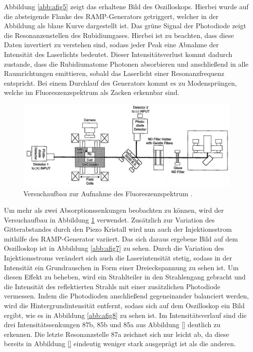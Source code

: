 Abbildung \ref{abb:afig5} zeigt das erhaltene Bild des Oszilloskops.
Hierbei wurde auf die absteigende Flanke des RAMP-Generators getriggert, welcher in der Abbildung als blaue Kurve dargestellt ist.
Das grüne Signal der Photodiode zeigt die Resonanzenstellen des Rubidiumgases.
Hierbei ist zu beachten, dass diese Daten invertiert zu verstehen sind, sodass jeder Peak eine Abnahme der Intensität des Laserlichts bedeutet.
Dieser Intensitätsverlust kommt dadurch zustande, dass die Rubidiumatome Photonen absorbieren und anschließend in alle Raumrichtungen emittieren, sobald das Laserlicht einer Resonanzfrequenz entspricht.
Bei einem Durchlauf des Generators kommt es zu Modensprüngen, welche im Fluoreszenzspektrum als Zacken erkennbar sind.

\begin{figure}
    \centering
    \includegraphics[width=\textwidth]{pics/aufbau3}
    \caption{Versuchaufbau zur Aufnahme des Fluoreszenzspektrum \cite{anleitung}.}
    \label{abb:afig6}
\end{figure}

Um mehr als zwei Absorptionssenkungen beobachten zu können, wird der Versuchaufbau in Abbildung \ref{abb:afig6} verwendet.
Zusätzlich zur Variation des Gitterabstandes durch den Piezo Kristall wird nun auch der Injektionsstrom mithilfe des RAMP-Generator variiert.
Das sich daraus ergebene Bild auf dem Oszilloskop ist in Abbildung \ref{abb:afig7} zu sehen.
Durch die Variation des Injektionsstroms verändert sich auch die Laserintensität stetig, sodass in der Intensität ein Grundrauschen in Form einer Dreieckspannung zu sehen ist.
Um diesen Effekt zu beheben, wird ein Strahlteiler in den Strahlengang gebracht und die Intensität des reflektierten Strahls mit einer zusätzlichen Photodiode vermessen.
Indem die Photodioden anschließend gegeneinander balanciert werden, wird die Hintergrundintensität entfernt, sodass sich auf dem Oszilloskop ein Bild ergibt, wie es in Abbildung \ref{abb:afig8} zu sehen ist.
Im Intensitätsverlauf sind die drei Intensitätssenkungen 87b, 85b und 85a aus Abbildung \ref{} deutlich zu erkennen.
Die letzte Resonanzstelle 87a zeichnet sich nur leicht ab, da diese bereits in Abbildung \ref{} eindeutig weniger stark ausgeprägt ist als die anderen.

